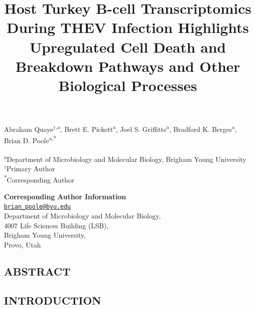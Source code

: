 \documentclass[
]{article}
\title{Host Turkey B-cell Transcriptomics During THEV Infection
Highlights Upregulated Cell Death and Breakdown Pathways and Other
Biological Processes}
\author{}
\date{\vspace{-2.5em}}
\begin{document}
\maketitle

\vspace{5mm}

Abraham Quaye\({^\dagger}\)\textsuperscript{,a}, Brett E.
Pickett\textsuperscript{a}, Joel S. Griffitts\textsuperscript{a},
Bradford K. Berges\textsuperscript{a}, Brian D.
Poole\textsuperscript{a,*}

\vspace{5mm}

\textsuperscript{a}Department of Microbiology and Molecular Biology,
Brigham Young University\\
\({^\dagger}\)Primary Author\\
\textsuperscript{*}Corresponding Author

\vspace{5mm}

\textbf{Corresponding Author Information}\\
\href{mailto:brian_poole@byu.edu}{\nolinkurl{brian\_poole@byu.edu}}\\
Department of Microbiology and Molecular Biology,\\
4007 Life Sciences Building (LSB),\\
Brigham Young University,\\
Provo, Utah\\

\newpage

\subsection{ABSTRACT}\label{abstract}

\newpage

\subsection{INTRODUCTION}\label{introduction}
\end{document}
